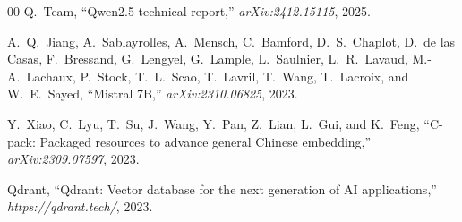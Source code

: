 \documentclass[conference]{IEEEtran}
\begin{document}
\begin{thebibliography}{00}
Q.~Team,
``Qwen2.5 technical report,''
\textit{arXiv:2412.15115}, 2025.

A.~Q.~Jiang, A.~Sablayrolles, A.~Mensch, C.~Bamford, D.~S.~Chaplot,
D.~de las Casas, F.~Bressand, G.~Lengyel, G.~Lample, L.~Saulnier,
L.~R.~Lavaud, M.-A.~Lachaux, P.~Stock, T.~L.~Scao, T.~Lavril,
T.~Wang, T.~Lacroix, and W.~E.~Sayed,
``Mistral 7B,''
\textit{arXiv:2310.06825}, 2023.

Y.~Xiao, C.~Lyu, T.~Su, J.~Wang, Y.~Pan, Z.~Lian, L.~Gui, and K.~Feng,
``C-pack: Packaged resources to advance general Chinese embedding,''
\textit{arXiv:2309.07597}, 2023.

Qdrant, ``Qdrant: Vector database for the next generation of AI applications,''
\textit{https://qdrant.tech/}, 2023.

\end{thebibliography}
\end{document}
